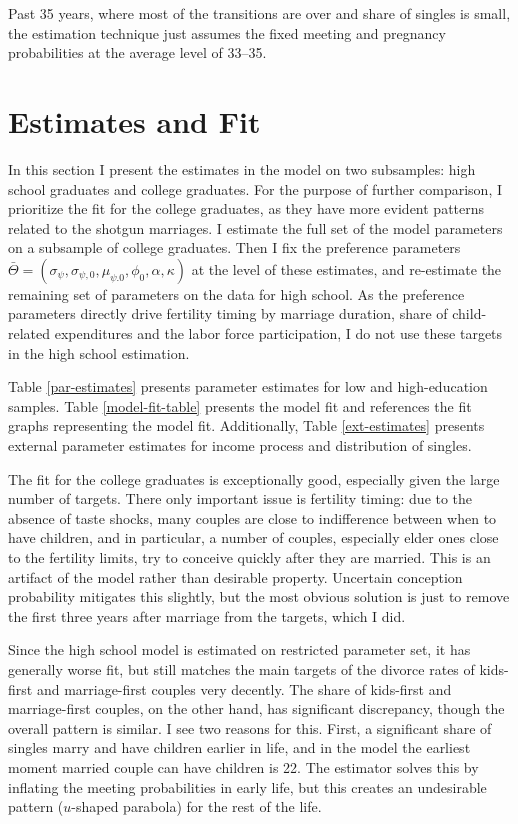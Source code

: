 \documentclass[12pt,letter]{article}
\begin{document}
Past 35 years, where most of the transitions are over and share of singles is small, the estimation technique just assumes the fixed meeting and pregnancy probabilities at the average level of 33--35. 

\fi

\section{Estimates and Fit}

In this section I present the estimates in the model on two subsamples: high school graduates and college graduates. For the purpose of further comparison, I prioritize the fit for the college graduates, as they have more evident patterns related to the shotgun marriages. I estimate the full set of the model parameters on a subsample of college graduates. Then I fix the preference parameters $\bar{\Theta} = (\sigma_{\psi},\sigma_{\psi,0},\mu_{\psi.0},\phi_0,\alpha,\kappa)$ at the level of these estimates, and re-estimate the remaining set of parameters on the data for high school. As the preference parameters directly drive fertility timing by marriage duration, share of child-related expenditures and the labor force participation, I do not use these targets in the high school estimation.

Table \ref{par-estimates} presents parameter estimates for low and high-education samples. Table \ref{model-fit-table} presents the model fit and references the fit graphs representing the model fit.  Additionally, Table \ref{ext-estimates} presents external parameter estimates for income process and distribution of singles. 

The fit for the college graduates is exceptionally good, especially given the large number of targets. There only important issue is fertility timing: due to the absence of taste shocks, many couples are close to indifference between when to have children, and in particular, a number of couples, especially elder ones close to the fertility limits, try to conceive quickly after they are married. This is an artifact of the model rather than desirable property. Uncertain conception probability mitigates this slightly, but the most obvious solution is just to remove the first three years after marriage from the targets, which I did.

Since the high school model is estimated on restricted parameter set, it has generally worse fit, but still matches the main targets of the divorce rates of kids-first and marriage-first couples very decently. The share of kids-first and marriage-first couples, on the other hand, has significant discrepancy, though the overall pattern is similar. I see two reasons for this. First, a significant share of singles marry and have children earlier in life, and in the model the earliest moment married couple can have children is 22. The estimator solves this by inflating the meeting probabilities in early life, but this creates an undesirable pattern ($u$-shaped parabola) for the rest of the life. %
\end{document}
